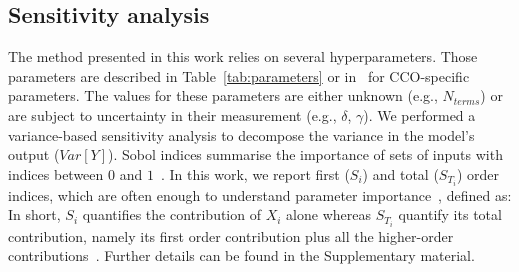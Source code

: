 \documentclass[11pt,]{article}
\let\oldequation\equation
\let\oldendequation\endequation
\renewenvironment{equation}
  {\linenomathNonumbers\oldequation}
  {\oldendequation\endlinenomath}
\begin{document}
\subsection{Sensitivity analysis}\label{sec:method-gsa}

The method presented in this work relies on several hyperparameters.
Those parameters are described in Table~\ref{tab:parameters} or in~\cite{Talou2021} for CCO-specific parameters.
The values for these parameters are either unknown (e.g., $N_{terms}$) or are subject to uncertainty in their measurement (e.g., $\delta$, $\gamma$).
We performed a variance-based sensitivity analysis to decompose the variance in the model's output ($Var[Y]$).
Sobol indices summarise the importance of sets of inputs with indices between $0$ and $1$~\cite{Saltelli2008}.
In this work, we report first ($S_i$) and total ($S_{T_i}$) order indices, which are often enough to understand parameter importance~\cite{Saltelli2008}, defined as:
In short, $S_i$ quantifies the contribution of $X_i$ alone whereas $S_{T_i}$ quantify its total contribution, namely its first order contribution plus all the higher-order contributions~\cite{Saltelli2008}.
Further details can be found in the Supplementary material.
\end{document}
